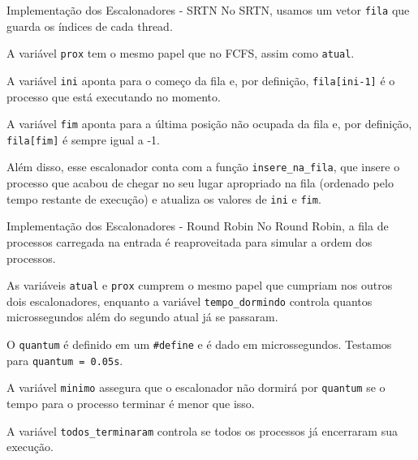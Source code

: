 \documentclass[10pt]{beamer}
\begin{document}
    \begin{frame}{Implementação dos Escalonadores - SRTN}
        No SRTN, usamos um vetor \texttt{fila} que guarda os índices de cada thread.

        A variável \texttt{prox} tem o mesmo papel que no FCFS, assim como
        \texttt{atual}.

        A variável \texttt{ini} aponta para o começo da fila e, por definição,
        \texttt{fila[ini-1]} é o processo que está executando no momento.

        A variável \texttt{fim} aponta para a última posição não ocupada da fila e,
        por definição, \texttt{fila[fim]} é sempre igual a -1.

        Além disso, esse escalonador conta com a função \texttt{insere\_na\_fila}, que
        insere o processo que acabou de chegar no seu lugar apropriado na fila
        (ordenado pelo tempo restante de execução) e atualiza os valores de
        \texttt{ini} e \texttt{fim}.
    \end{frame}

    \begin{frame}{Implementação dos Escalonadores - Round Robin}
        No Round Robin, a fila de processos carregada na entrada é reaproveitada para simular a ordem dos processos.

        As variáveis \texttt{atual} e \texttt{prox} cumprem o mesmo papel que cumpriam nos outros dois escalonadores,
        enquanto a variável \texttt{tempo\_dormindo} controla quantos microssegundos além do segundo atual já se passaram.

        O \texttt{quantum} é definido em um \texttt{\#define} e é dado em microssegundos. Testamos para \texttt{quantum = 0.05s}.

        A variável \texttt{minimo} assegura que o escalonador não dormirá por \texttt{quantum} se o tempo para o processo terminar é menor que isso.

        A variável \texttt{todos\_terminaram} controla se todos os processos já encerraram sua execução.
    \end{frame}
\end{document}
